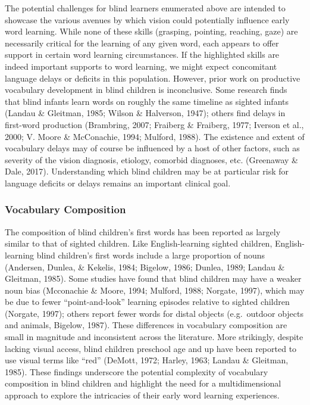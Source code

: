 \documentclass[
  man,floatsintext]{apa6}
\begin{document}
The potential challenges for blind learners enumerated above are intended to showcase the various avenues by which vision could potentially influence early word learning. While none of these skills (grasping, pointing, reaching, gaze) are necessarily critical for the learning of any given word, each appears to offer support in certain word learning circumstances. If the highlighted skills are indeed important supports to word learning, we might expect concomitant language delays or deficits in this population. However, prior work on productive vocabulary development in blind children is inconclusive. Some research finds that blind infants learn words on roughly the same timeline as sighted infants (Landau \& Gleitman, 1985; Wilson \& Halverson, 1947); others find delays in first-word production (Brambring, 2007; Fraiberg \& Fraiberg, 1977; Iverson et al., 2000; V. Moore \& McConachie, 1994; Mulford, 1988). The existence and extent of vocabulary delays may of course be influenced by a host of other factors, such as severity of the vision diagnosis, etiology, comorbid diagnoses, etc. (Greenaway \& Dale, 2017). Understanding which blind children may be at particular risk for language deficits or delays remains an important clinical goal.

\hypertarget{vocabulary-composition}{%
\subsubsection{Vocabulary Composition}\label{vocabulary-composition}}

The composition of blind children's first words has been reported as largely similar to that of sighted children. Like English-learning sighted children, English-learning blind children's first words include a large proportion of nouns (Andersen, Dunlea, \& Kekelis, 1984; Bigelow, 1986; Dunlea, 1989; Landau \& Gleitman, 1985). Some studies have found that blind children may have a weaker noun bias (Mcconachie \& Moore, 1994; Mulford, 1988; Norgate, 1997), which may be due to fewer ``point-and-look'' learning episodes relative to sighted children (Norgate, 1997); others report fewer words for distal objects (e.g.~outdoor objects and animals, Bigelow, 1987). These differences in vocabulary composition are small in magnitude and inconsistent across the literature. More strikingly, despite lacking visual access, blind children preschool age and up have been reported to use visual terms like ``red'' (DeMott, 1972; Harley, 1963; Landau \& Gleitman, 1985). These findings underscore the potential complexity of vocabulary composition in blind children and highlight the need for a multidimensional approach to explore the intricacies of their early word learning experiences.
\end{document}
